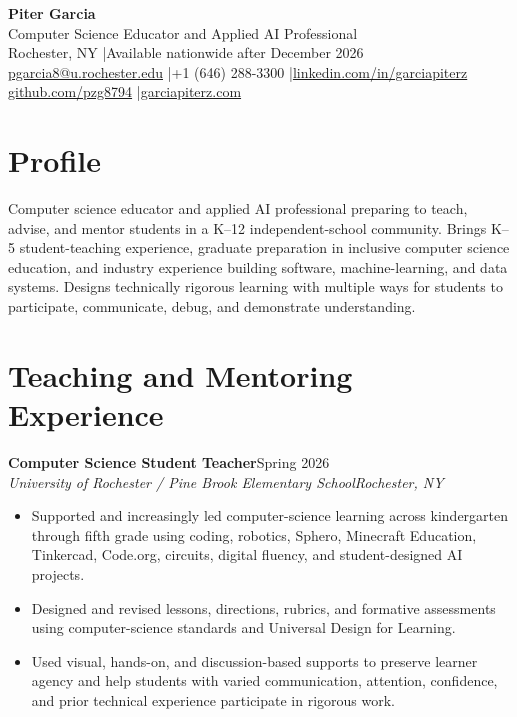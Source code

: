 \documentclass[10pt,letterpaper]{article}
\newcommand{\role}[4]{%
  \textbf{#1}\hfill #2\\
  \textit{#3}\hfill \textit{#4}\vspace{-3pt}
}
\begin{document}
\fontsize{9}{10.5}\selectfont

\begin{center}
  {\Large\bfseries Piter Garcia}\\[1pt]
  {\large Computer Science Educator and Applied AI Professional}\\[2pt]
  Rochester, NY \enspace|\enspace Available nationwide after December 2026\\
  \href{mailto:pgarcia8@u.rochester.edu}{pgarcia8@u.rochester.edu}
  \enspace|\enspace +1 (646) 288-3300
  \enspace|\enspace \href{https://linkedin.com/in/garciapiterz}{linkedin.com/in/garciapiterz}\\
  \href{https://github.com/pzg8794}{github.com/pzg8794}
  \enspace|\enspace \href{https://garciapiterz.com}{garciapiterz.com}
\end{center}

\section*{Profile}
Computer science educator and applied AI professional preparing to teach,
advise, and mentor students in a K--12 independent-school community. Brings
K--5 student-teaching experience, graduate preparation in inclusive computer
science education, and industry experience building software, machine-learning,
and data systems. Designs technically rigorous learning with multiple ways for
students to participate, communicate, debug, and demonstrate understanding.

\section*{Teaching and Mentoring Experience}
\role{Computer Science Student Teacher}{Spring 2026}
{University of Rochester / Pine Brook Elementary School}{Rochester, NY}
\begin{itemize}
  \item Supported and increasingly led computer-science learning across
    kindergarten through fifth grade using coding, robotics, Sphero, Minecraft
    Education, Tinkercad, Code.org, circuits, digital fluency, and
    student-designed AI projects.
  \item Designed and revised lessons, directions, rubrics, and formative
    assessments using computer-science standards and Universal Design for
    Learning.
  \item Used visual, hands-on, and discussion-based supports to preserve learner
    agency and help students with varied communication, attention, confidence,
    and prior technical experience participate in rigorous work.
\end{itemize}
\end{document}
